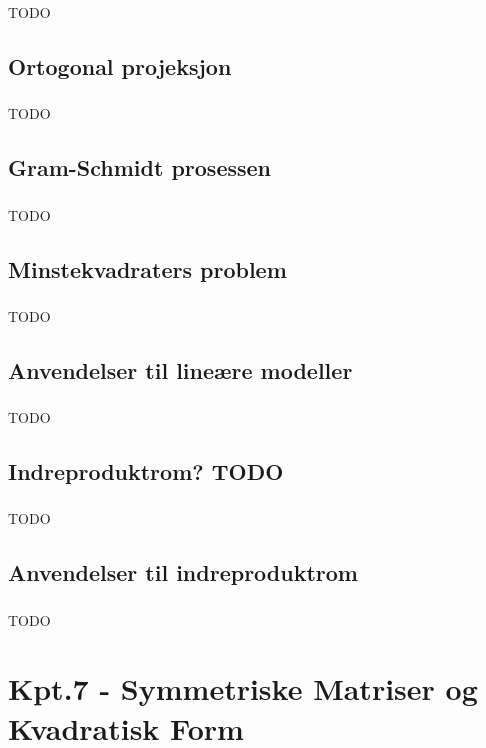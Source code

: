 \documentclass{article}
\begin{document}
      \subsubsection{}
        TODO
    \subsection{Ortogonal projeksjon}
      \subsubsection{}
        TODO
    \subsection{Gram-Schmidt prosessen}
      \subsubsection{}
        TODO
    \subsection{Minstekvadraters problem}
      \subsubsection{}
        TODO
    \subsection{Anvendelser til lineære modeller}
      \subsubsection{}
        TODO
    \subsection{Indreproduktrom? TODO}
      \subsubsection{}
        TODO
    \subsection{Anvendelser til indreproduktrom}
      \subsubsection{}
        TODO
  \section{Kpt.7 - Symmetriske Matriser og Kvadratisk Form}
\end{document}
